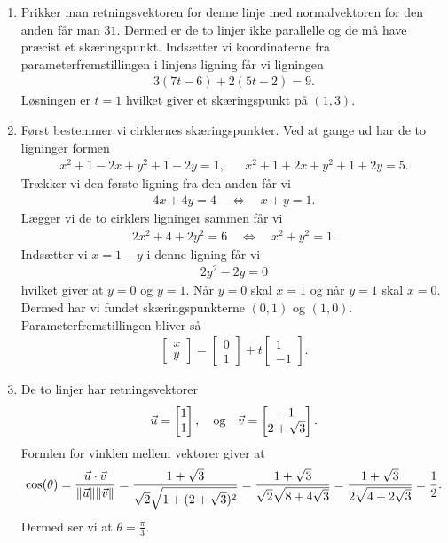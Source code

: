 \begin{enumerate}
	\item Prikker man retningsvektoren for denne linje med normalvektoren for den anden får man $31$. Dermed er de to linjer ikke parallelle og de må have præcist et skæringspunkt. Indsætter vi koordinaterne fra parameterfremstillingen i linjens ligning får vi ligningen
	\begin{align*}
	3(7t-6)+2(5t-2)=9.
	\end{align*}
	Løsningen er $t=1$ hvilket giver et skæringspunkt på $(1,3)$.
	
	\item Først bestemmer vi cirklernes skæringspunkter. Ved at gange ud har de to ligninger formen
	\begin{align*}
	x^2+1-2x+y^2+1-2y=1,&&x^2+1+2x+y^2+1+2y=5.
	\end{align*}
	Trækker vi den første ligning fra den anden får vi
	\begin{align*}
	4x+4y=4\quad \Leftrightarrow\quad x+y=1.
	\end{align*}
	Lægger vi de to cirklers ligninger sammen får vi
	\begin{align*}
	2x^2+4+2y^2=6\quad \Leftrightarrow\quad x^2+y^2=1.
	\end{align*}
	Indsætter vi $x=1-y$ i denne ligning får vi 
	\begin{align*}
	2y^2-2y=0
	\end{align*}
	hvilket giver at $y=0$ og $y=1$. Når $y=0$ skal $x=1$ og når $y=1$ skal $x=0$. Dermed har vi fundet skæringspunkterne $(0,1)$ og $(1,0)$. Parameterfremstillingen bliver så
	\begin{align*}
	\begin{bmatrix}
	x\\y
	\end{bmatrix}=\begin{bmatrix}
	0\\1
	\end{bmatrix}+t \begin{bmatrix}
	1\\-1
	\end{bmatrix}.
	\end{align*}
	

	
	\item\label{it:2dvec14ans} De to linjer har retningsvektorer 
	\begin{align*}
	\vec{u}=\begin{bmatrix}
	1\\1
	\end{bmatrix},\quad \textup{og} \quad \vec{v}= \begin{bmatrix}
	-1\\2+\sqrt{3}
	\end{bmatrix}.
	\end{align*}
	Formlen for vinklen mellem vektorer giver at
	\begin{align*}
	\cos(\theta)=\frac{\vec{u}\cdot \vec{v}}{\Vert \vec{u}\Vert\Vert \vec{v}\Vert}=\frac{1+\sqrt{3}}{\sqrt{2}\sqrt{1+(2+\sqrt{3})^2}}=\frac{1+\sqrt{3}}{\sqrt{2}\sqrt{8+4\sqrt{3}}}=\frac{1+\sqrt{3}}{2\sqrt{4+2\sqrt{3}}}=\frac{1}{2}.
	\end{align*}
	Dermed ser vi at $\theta=\frac{\pi}{3}$.
	

\end{enumerate}
